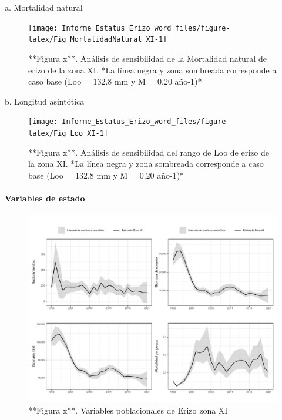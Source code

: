 \documentclass[
]{article}
\begin{document}
a. Mortalidad natural

\begin{figure}

{\centering \texttt{[image: Informe\_Estatus\_Erizo\_word\_files/figure-latex/Fig\_MortalidadNatural\_XI-1]} 

}

\caption{**Figura x**.  Análisis de sensibilidad de la Mortalidad natural de erizo de la zona XI. *La línea negra y zona sombreada corresponde a caso base (Loo = 132.8 mm y M = 0.20 año-1)*}\label{fig:Fig_MortalidadNatural_XI}
\end{figure}

b. Longitud asintótica

\begin{figure}

{\centering \texttt{[image: Informe\_Estatus\_Erizo\_word\_files/figure-latex/Fig\_Loo\_XI-1]} 

}

\caption{**Figura x**.  Análisis de sensibilidad del rango de Loo de erizo de la zona XI. *La línea negra y zona sombreada corresponde a caso base (Loo = 132.8 mm y M = 0.20 año-1)*}\label{fig:Fig_Loo_XI}
\end{figure}

\hypertarget{variables-de-estado-1}{%
\paragraph{Variables de estado}\label{variables-de-estado-1}}

\begin{figure}

{\centering \includegraphics{Figuras/Fig_VarpoblXI-1} 

}

\caption{**Figura x**. Variables poblacionales de Erizo zona XI}\label{fig:Fig_VarpoblXI}
\end{figure}
\end{document}
